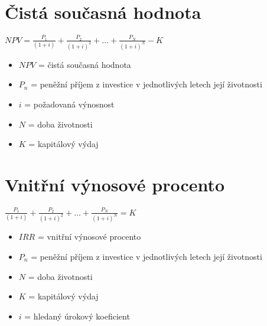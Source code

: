 \documentclass[12pt, aspectratio=169]{beamer} %
\begin{document}
\section{Čistá současná hodnota}

\begin{frame}{\insertsection}

    \begin{center}
        $NPV = \frac{P_1}{(1+i)} + \frac{P_2}{(1+i)^2} + \ldots + \frac{P_N}{(1+i)^N} - K$
    \end{center}
    
    \vspace{10pt} %
    \begin{itemize}
        \item $NPV$ = čistá současná hodnota
        \item $P_n$ = peněžní příjem z investice v jednotlivých letech její životnosti
        \item $i$ = požadovaná výnosnost
        \item $N$ = doba životnosti
        \item $K$ = kapitálový výdaj
    \end{itemize}

\end{frame}

\section{Vnitřní výnosové procento}

\begin{frame}{\insertsection}

    \begin{center}
         $\frac{P_1}{(1+i)} + \frac{P_2}{(1+i)^2} + \ldots + \frac{P_N}{(1+i)^N} = K$
    \end{center}
    
    \vspace{10pt}

    \begin{itemize}
        \item $IRR$ = vnitřní výnosové procento
        \item $P_n$ = peněžní příjem z investice v jednotlivých letech její životnosti
        \item $N$ = doba životnosti
        \item $K$ = kapitálový výdaj
        \item $i$ = hledaný úrokový koeficient
    \end{itemize}

\end{frame}
\end{document}
